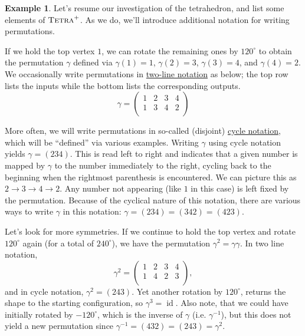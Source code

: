 \documentclass[11pt]{amsart}
\theoremstyle{plain}
\theoremstyle{definition}
\newtheorem{example}{Example}
\theoremstyle{remark}
\newcommand{\rsymtetra}{\textsc{Tetra}^+}
\DeclareMathOperator{\id}{id}
\begin{document}
\begin{example}
Let's resume our investigation of the tetrahedron, and list some  elements of $\rsymtetra$. As we do, we'll introduce additional notation for writing permutations. 

If we hold the top vertex $1$, we can rotate the remaining ones by $120^\circ$ to obtain the permutation $\gamma$ defined via $\gamma(1) = 1$, $\gamma(2) = 3$, $\gamma(3) = 4$, and $\gamma(4) = 2$. We  occasionally write permutations in \href{https://en.wikipedia.org/wiki/Permutation#Two-line_notation}{two-line notation} as below; the top row lists the inputs while the bottom lists the corresponding outputs.
\[\gamma = \begin{pmatrix}
1 & 2 & 3 & 4\\
1 & 3 & 4 & 2\\
\end{pmatrix}\]

More often, we will write permutations in so-called (disjoint) \href{https://en.wikipedia.org/wiki/Permutation#Cycle_notation}{cycle notation}, which  will be ``defined'' via various examples. Writing $\gamma$ using cycle notation yields $\gamma = (234)$. This is read left to right and indicates that a given number is mapped by $\gamma$ to the number immediately to the right, cycling back to the beginning when the rightmost parenthesis is encountered. We can picture this as $2\rightarrow 3\rightarrow 4\rightarrow 2$. Any number not appearing (like $1$ in this case) is left fixed by the permutation. Because of the cyclical nature of this notation, there are various ways to write $\gamma$ in this notation: $\gamma = (234) = (342) = (423)$.

Let's look for more symmetries. If we continue to hold the top vertex and rotate $120^\circ$ again (for a total of $240^\circ$), we have the permutation $\gamma^2 = \gamma\gamma$. In two line notation, 
\[\gamma^2 = \begin{pmatrix}
1 & 2 & 3 & 4\\
1 & 4 & 2 & 3\\
\end{pmatrix},\]
and in cycle notation, $\gamma^2 = (243)$. Yet another rotation by $120^\circ$, returns the shape to the starting configuration, so $\gamma^3 = \id$. Also note, that we could have initially rotated by $-120^\circ$, which is the inverse of $\gamma$ (i.e. $\gamma^{-1}$), but this does not yield a new permutation since $\gamma^{-1} = (432) = (243) = \gamma^2$.


\end{example}
\end{document}
